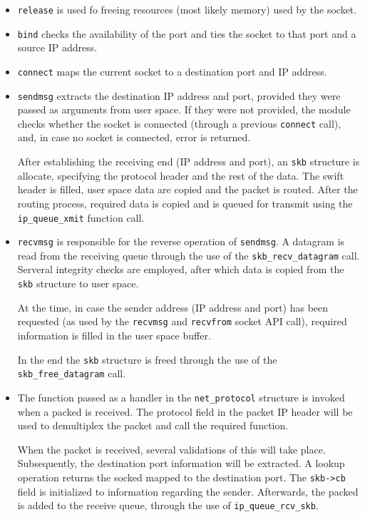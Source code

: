 \begin{itemize}
  \item \texttt{release} is used fo freeing resources (most likely memory)
  used by the socket.
  \item \texttt{bind} checks the availability of the port and ties the socket
  to that port and a source IP address.
  \item \texttt{connect} maps the current socket to a destination port and IP
  address.
  \item \texttt{sendmsg} extracts the destination IP address and port,
  provided they were passed as arguments from user space. If they were not
  provided, the module checks whether the socket is connected (through a
  previous \texttt{connect} call), and, in case no socket is connected, error
  is returned.

  After establishing the receiving end (IP address and port), an
  \texttt{skb} structure is allocate, specifying the protocol header and the
  rest of the data. The swift header is filled, user space data are copied and
  the packet is routed. After the routing process, required data is copied and
  is queued for transmit using the \texttt{ip\_queue\_xmit} function call.

  \item \texttt{recvmsg} is responsible for the reverse operation of
  \texttt{sendmsg}. A datagram is read from the receiving queue through the
  use of the \texttt{skb\_recv\_datagram} call. Serveral integrity checks are
  employed, after which data is copied from the \texttt{skb} structure to user
  space.

  At the time, in case the sender address (IP address and port) has been
  requested (as used by the \texttt{recvmsg} and \texttt{recvfrom} socket API
  call), required information is filled in the user space buffer.

  In the end the \texttt{skb} structure is freed through the use of the
  \texttt{skb\_free\_datagram} call.

  \item The function passed as a handler in the \texttt{net\_protocol}
  structure is invoked when a packed is received. The protocol field in the
  packet IP header will be used to demultiplex the packet and call the
  required function.

  When the packet is received, several validations of this will take place.
  Subsequently, the destination port information will be extracted. A lookup
  operation returns the socked mapped to the destination port. The
  \texttt{skb->cb} field is initialized to information regarding the sender.
  Afterwards, the packed is added to the receive queue, through the use of
  \texttt{ip\_queue\_rcv\_skb}.
\end{itemize}

